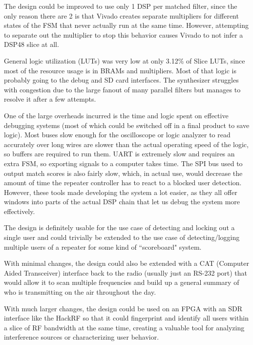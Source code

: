 \documentclass[conference]{IEEEtran}
\begin{document}
The design could be improved to use only 1 DSP per matched filter, since the only reason there are 2 is that Vivado creates separate multipliers for different states of the FSM that never actually run at the same time. However, attempting to separate out the multiplier to stop this behavior causes Vivado to not infer a DSP48 slice at all.

General logic utilization (LUTs) was very low at only 3.12\% of Slice LUTs, since most of the resource usage is in BRAMs and multipliers. Most of that logic is probably going to the debug and SD card interfaces. The synthesizer struggles with congestion due to the large fanout of many parallel filters but manages to resolve it after a few attempts.

One of the large overheads incurred is the time and logic spent on effective debugging systems (most of which could be switched off in a final product to save logic). Most buses slow enough for the oscilloscope or logic analyzer to read accurately over long wires are slower than the actual operating speed of the logic, so buffers are required to run them. UART is extremely slow and requires an extra FSM, so exporting signals to a computer takes time. The SPI bus used to output match scores is also fairly slow, which, in actual use, would decrease the amount of time the repeater controller has to react to a blocked user detection. However, these tools made developing the system a lot easier, as they all offer windows into parts of the actual DSP chain that let us debug the system more effectively.

The design is definitely usable for the use case of detecting and locking out a single user and could trivially be extended to the use case of detecting/logging multiple users of a repeater for some kind of ``scoreboard" system.

With minimal changes, the design could also be extended with a CAT (Computer Aided Transceiver) interface back to the radio (usually just an RS-232 port) that would allow it to scan multiple frequencies and build up a general summary of who is transmitting on the air throughout the day.

With much larger changes, the design could be used on an FPGA with an SDR interface like the HackRF so that it could fingerprint and identify all users within a slice of RF bandwidth at the same time, creating a valuable tool for analyzing interference sources or characterizing user behavior.
\end{document}
